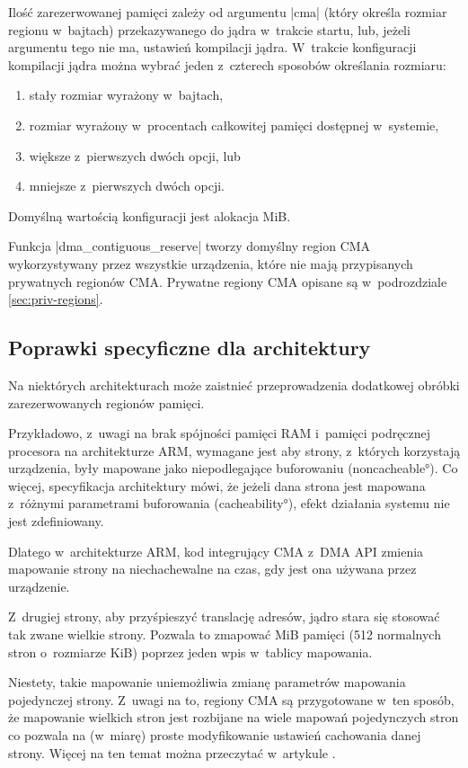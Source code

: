 Ilość zarezerwowanej pamięci zależy od argumentu \code|cma|
(który określa rozmiar regionu w~bajtach) przekazywanego do jądra
w~trakcie startu, lub, jeżeli argumentu tego nie ma, ustawień
kompilacji jądra.  W~trakcie konfiguracji kompilacji jądra można
wybrać jeden z~czterech sposobów określania rozmiaru:

\begin{enumerate}
\item stały rozmiar wyrażony w~bajtach,
\item rozmiar wyrażony w~procentach całkowitej pamięci dostępnej
  w~systemie,
\item większe z~pierwszych dwóch opcji, lub
\item mniejsze z~pierwszych dwóch opcji.
\end{enumerate}

Domyślną wartością konfiguracji jest alokacja \unit[16]{MiB}.

Funkcja \code|dma_contiguous_reserve| tworzy domyślny region
CMA wykorzystywany przez wszystkie urządzenia, które nie mają
przypisanych prywatnych regionów CMA.  Prywatne regiony CMA opisane są
w~podrozdziale \ref{sec:priv-regions}.


\subsection{Poprawki specyficzne dla architektury}

Na niektórych architekturach może zaistnieć przeprowadzenia dodatkowej
obróbki zarezerwowanych regionów pamięci.

Przykładowo, z~uwagi na brak spójności pamięci RAM i~pamięci
podręcznej procesora na architekturze ARM, wymagane jest aby strony,
z~których korzystają urządzenia, były mapowane jako niepodlegające
buforowaniu (\ang{noncacheable}).  Co więcej, specyfikacja
architektury mówi, że jeżeli dana strona jest mapowana z~różnymi
parametrami buforowania (\ang{cacheability}), efekt działania systemu
nie jest zdefiniowany.

Dlatego w~architekturze ARM, kod integrujący CMA z~DMA API zmienia
mapowanie strony na niechachewalne na czas, gdy jest ona używana przez
urządzenie.

Z~drugiej strony, aby przyśpieszyć translację adresów, jądro stara się
stosować tak zwane wielkie strony.  Pozwala to zmapować \unit[2]{MiB}
pamięci (512 normalnych stron o~rozmiarze \unit[4]{KiB}) poprzez jeden
wpis w~tablicy mapowania.

Niestety, takie mapowanie uniemożliwia zmianę parametrów mapowania
pojedynczej strony.  Z~uwagi na to, regiony CMA są przygotowane w~ten
sposób, że mapowanie wielkich stron jest rozbijane na wiele mapowań
pojedynczych stron co pozwala na (w~miarę) proste modyfikowanie
ustawień cachowania danej strony.  Więcej na ten temat można
przeczytać w~artykule \cite{bib:cma-and-arm}.

